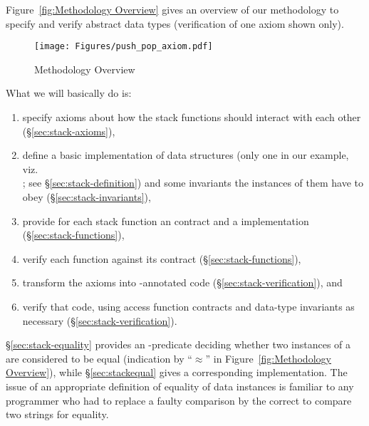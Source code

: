 Figure~\ref{fig:Methodology Overview}
gives an overview of our methodology to specify and verify abstract
data types (verification of one axiom shown only).

\begin{figure}[hbt]
\centering
\texttt{[image: Figures/push\_pop\_axiom.pdf]}
\caption{Methodology Overview}
\end{figure}

What we will basically do is:
\begin{enumerate}
\item  specify axioms about how the stack functions should
  interact with each other
  (\S\ref{sec:stack-axioms}),
\item  define a basic implementation of \isoc data structures
  (only one in our example, viz.\\
  ;
  see \S\ref{sec:stack-definition})
  and some invariants the instances of them have to obey
  (\S\ref{sec:stack-invariants}),
\item  provide for each stack function an \acsl contract and a 
  \isoc implementation 
  (\S\ref{sec:stack-functions}),
\item  verify each function against its contract
  (\S\ref{sec:stack-functions}),
\item  transform the axioms into \acsl-annotated \isoc code
  (\S\ref{sec:stack-verification}), and
\item  verify that code, using access function contracts and
  data-type invariants as necessary
  (\S\ref{sec:stack-verification}).
\end{enumerate}

\S\ref{sec:stack-equality}
provides an \acsl-predicate deciding whether two instances of a
 are considered to be equal (indication by ``$\approx$''
in Figure~\ref{fig:Methodology Overview}), while
\S\ref{sec:stackequal} gives a
corresponding \isoc implementation.
The issue of an appropriate definition of equality of data instances
is familiar to any \isoc programmer who had to replace a faulty
comparison  by the correct 
 to compare two strings 
 for equality.

\clearpage

\clearpage
\clearpage
\clearpage
\clearpage
\clearpage


